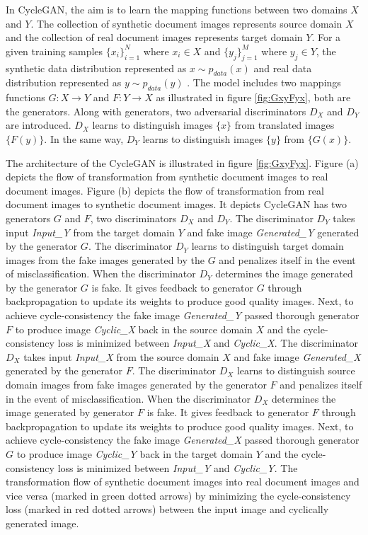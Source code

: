 In \ac{CycleGAN}, the aim is to learn the mapping functions between two domains $X$ and $Y$. The collection of synthetic document images represents source domain $X$ and the collection of real document images represents target domain $Y$. For a given training samples $\{x_i\}_{i=1}^{N}$ where $x_i \in X$ and $\{y_j\}_{j=1}^{M}$ where $y_j \in Y$, the synthetic data distribution represented as $x \sim p_{data}(x)$ and real data distribution represented as $y \sim p_{data}(y)$ \cite{zhao2021unpaired}. The model includes two mappings functions $G : X \rightarrow Y$ and $F : Y \rightarrow X$ as illustrated in figure \ref{fig:GxyFyx}, both are the generators. Along with generators, two adversarial discriminators $D_X$ and $D_Y$ are introduced. $D_X$ learns to distinguish images $\{x\}$ from translated images $\{F(y)\}$. In the same way, $D_Y$ learns to distinguish images $\{y\}$ from $\{G(x)\}$.

The architecture of the \ac{CycleGAN} is illustrated in figure \ref{fig:GxyFyx}. Figure (a) depicts the flow of transformation from synthetic document images to real document images. Figure (b) depicts the flow of transformation from real document images to synthetic document images. It depicts \ac{CycleGAN} has two generators $G$ and $F$, two discriminators $D_X$ and $D_Y$. The discriminator $D_Y$ takes input \textit{Input\_Y} from the target domain $Y$ and fake image \textit{Generated\_Y} generated by the generator $G$. The discriminator $D_Y$ learns to distinguish target domain images from the fake images generated by the $G$ and penalizes itself in the event of misclassification. When the discriminator $D_Y$ determines the image generated by the generator $G$ is fake. It gives feedback to generator $G$ through backpropagation to update its weights to produce good quality images. Next, to achieve cycle-consistency the fake image \textit{Generated\_Y} passed thorough generator $F$ to produce image \textit{Cyclic\_X} back in the source domain $X$ and the cycle-consistency loss is minimized between \textit{Input\_X} and \textit{Cyclic\_X}. The discriminator $D_X$ takes input \textit{Input\_X} from the source domain $X$ and fake image \textit{Generated\_X} generated by the generator $F$. The discriminator $D_X$ learns to distinguish source domain images from fake images generated by the generator $F$ and penalizes itself in the event of misclassification. When the discriminator $D_X$ determines the image generated by generator $F$ is fake. It gives feedback to generator $F$ through backpropagation to update its weights to produce good quality images. Next, to achieve cycle-consistency the fake image \textit{Generated\_X} passed thorough generator $G$ to produce image \textit{Cyclic\_Y} back in the target domain $Y$ and the cycle-consistency loss is minimized between \textit{Input\_Y} and \textit{Cyclic\_Y}. The transformation flow of synthetic document images into real document images and vice versa (marked in green dotted arrows) by minimizing the cycle-consistency loss (marked in red dotted arrows) between the input image and cyclically generated image. 


